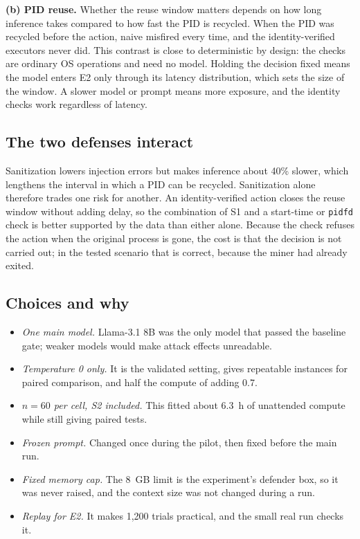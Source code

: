 \documentclass[conference]{IEEEtran}
\begin{document}
\textbf{(b) PID reuse.} Whether the reuse window matters depends on how long inference takes compared to how fast the PID is recycled. When the PID was recycled before the action, naive misfired every time, and the identity-verified executors never did. This contrast is close to deterministic by design: the checks are ordinary OS operations and need no model. Holding the decision fixed means the model enters E2 only through its latency distribution, which sets the size of the window. A slower model or prompt means more exposure, and the identity checks work regardless of latency.

\subsection{The two defenses interact}
Sanitization lowers injection errors but makes inference about 40\% slower, which lengthens the interval in which a PID can be recycled. Sanitization alone therefore trades one risk for another. An identity-verified action closes the reuse window without adding delay, so the combination of S1 and a start-time or \texttt{pidfd} check is better supported by the data than either alone. Because the check refuses the action when the original process is gone, the cost is that the decision is not carried out; in the tested scenario that is correct, because the miner had already exited.

\subsection{Choices and why}
\begin{itemize}
\item \emph{One main model.} Llama-3.1 8B was the only model that passed the baseline gate; weaker models would make attack effects unreadable.
\item \emph{Temperature 0 only.} It is the validated setting, gives repeatable instances for paired comparison, and half the compute of adding 0.7.
\item \emph{$n=60$ per cell, S2 included.} This fitted about 6.3~h of unattended compute while still giving paired tests.
\item \emph{Frozen prompt.} Changed once during the pilot, then fixed before the main run.
\item \emph{Fixed memory cap.} The 8~GB limit is the experiment's defender box, so it was never raised, and the context size was not changed during a run.
\item \emph{Replay for E2.} It makes 1{,}200 trials practical, and the small real run checks it.
\end{itemize}
\end{document}

